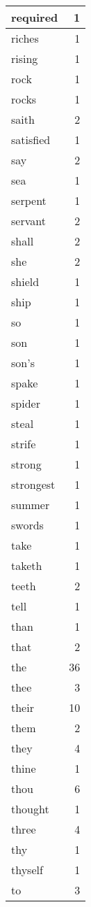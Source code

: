 \begin{center}
\begin{longtable}{l|r}
required & 1\\ \hline 
riches & 1\\ \hline 
rising & 1\\ \hline 
rock & 1\\ \hline 
rocks & 1\\ \hline 
saith & 2\\ \hline 
satisfied & 1\\ \hline 
say & 2\\ \hline 
sea & 1\\ \hline 
serpent & 1\\ \hline 
servant & 2\\ \hline 
shall & 2\\ \hline 
she & 2\\ \hline 
shield & 1\\ \hline 
ship & 1\\ \hline 
so & 1\\ \hline 
son & 1\\ \hline 
son's & 1\\ \hline 
spake & 1\\ \hline 
spider & 1\\ \hline 
steal & 1\\ \hline 
strife & 1\\ \hline 
strong & 1\\ \hline 
strongest & 1\\ \hline 
summer & 1\\ \hline 
swords & 1\\ \hline 
take & 1\\ \hline 
taketh & 1\\ \hline 
teeth & 2\\ \hline 
tell & 1\\ \hline 
than & 1\\ \hline 
that & 2\\ \hline 
the & 36\\ \hline 
thee & 3\\ \hline 
their & 10\\ \hline 
them & 2\\ \hline 
they & 4\\ \hline 
thine & 1\\ \hline 
thou & 6\\ \hline 
thought & 1\\ \hline 
three & 4\\ \hline 
thy & 1\\ \hline 
thyself & 1\\ \hline 
to & 3\\ \hline 

\end{longtable}
\end{center}
